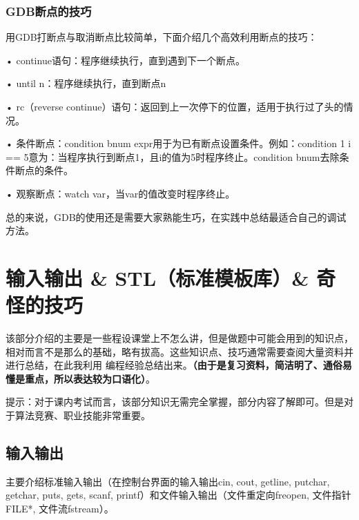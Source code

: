 \documentclass[UTF8]{ctexart}
\begin{document}
\subsubsection{GDB断点的技巧}
用GDB打断点与取消断点比较简单，下面介绍几个高效利用断点的技巧：

• continue语句：程序继续执行，直到遇到下一个断点。

• until n：程序继续执行，直到断点n

• rc（reverse continue）语句：返回到上一次停下的位置，适用于执行过了头的情况。

• 条件断点：condition bnum expr用于为已有断点设置条件。例如：condition 1 i == 5意为：当程序执行到断点1，且i的值为5时程序终止。condition bnum去除条件断点的条件。

• 观察断点：watch var，当var的值改变时程序终止。

总的来说，GDB的使用还是需要大家熟能生巧，在实践中总结最适合自己的调试方法。
\section{输入输出 \& STL（标准模板库）\& 奇怪的技巧}

该部分介绍的主要是一些程设课堂上不怎么讲，但是做题中可能会用到的知识点，相对而言不是那么的基础，略有拔高。这些知识点、技巧通常需要查阅大量资料并进行总结，在此我利用
编程经验总结出来。\textbf{（由于是复习资料，简洁明了、通俗易懂是重点，所以表达较为口语化）}。

提示：对于课内考试而言，该部分知识无需完全掌握，部分内容了解即可。但是对于算法竞赛、职业技能非常重要。
\subsection{输入输出}
主要介绍标准输入输出（在控制台界面的输入输出cin, cout, getline, putchar, getchar, puts, gets, scanf, printf）和文件输入输出（文件重定向freopen, 文件指针 FILE*, 文件流fstream）。
\end{document}
